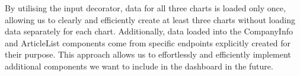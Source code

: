 By utilising the input decorator, data for all three charts is loaded only once, allowing us to clearly and efficiently create at least three charts without loading data separately for each chart. Additionally, data loaded into the CompanyInfo and ArticleList components come from specific endpoints explicitly created for their purpose. This approach allows us to effortlessly and efficiently implement additional components we want to include in the dashboard in the future.